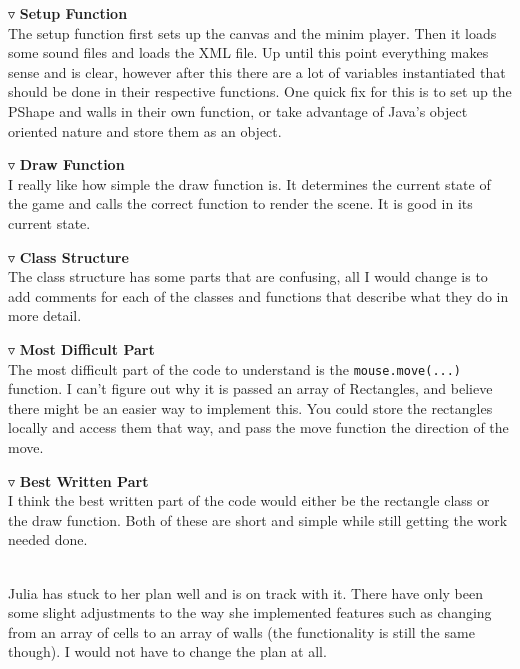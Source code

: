 \documentclass[12 pt]{article}
\renewcommand{\section}[1]{\bigskip \par \noindent {$\blacktriangledown$ \large \bf #1} \\[2ex] \hspace*{0.75cm}}
\renewcommand{\subsection}[1]{\medskip \par {$\triangledown$ \bf #1} \\[1ex] \hspace*{1cm}}
\begin{document}
\subsection{Setup Function}
The setup function first sets up the canvas and the minim player. Then it loads some sound files and loads the XML file. Up until this point everything makes sense and is clear, however after this there are a lot of variables instantiated that should be done in their respective functions. One quick fix for this is to set up the PShape and walls in their own function, or take advantage of Java's object oriented nature and store them as an object.
\subsection{Draw Function}
I really like how simple the draw function is. It determines the current state of the game and calls the correct function to render the scene. It is good in its current state.
\subsection{Class Structure}
The class structure has some parts that are confusing, all I would change is to add comments for each of the classes and functions that describe what they do in more detail.
\subsection{Most Difficult Part}
The most difficult part of the code to understand is the \verb|mouse.move(...)| function. I can't figure out why it is passed an array of Rectangles, and believe there might be an easier way to implement this. You could store the rectangles locally and access them that way, and pass the move function the direction of the move. 
\subsection{Best Written Part}
I think the best written part of the code would either be the rectangle class or the draw function. Both of these are short and simple while still getting the work needed done.

\newpage
\section{Adjusted Plan}
Julia has stuck to her plan well and is on track with it. There have only been some slight adjustments to the way she implemented features such as changing from an array of cells to an array of walls (the functionality is still the same though). I would not have to change the plan at all.
\end{document}

